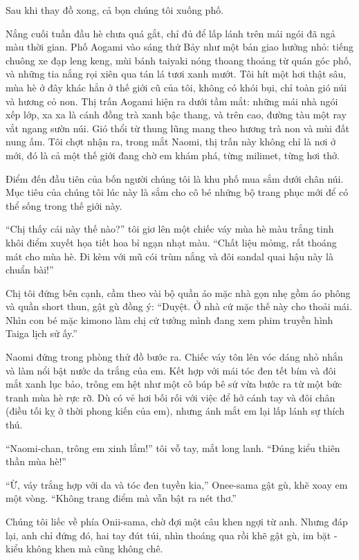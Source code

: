 \documentclass[../main.tex]{subfiles}
\begin{document}
Sau khi thay đồ xong, cả bọn chúng tôi xuống phố.

Nắng cuối tuần đầu hè chưa quá gắt, chỉ đủ để lấp lánh trên mái ngói đã ngả màu thời gian. Phố Aogami vào sáng thứ Bảy như một bản giao hưởng nhỏ: tiếng chuông xe đạp leng keng, mùi bánh taiyaki nóng thoang thoảng từ quán góc phố, và những tia nắng rọi xiên qua tán lá tươi xanh mướt. Tôi hít một hơi thật sâu, mùa hè ở đây khác hẳn ở thế giới cũ của tôi, không có khói bụi, chỉ toàn gió núi và hương cỏ non. Thị trấn Aogami hiện ra dưới tầm mắt: những mái nhà ngói xếp lớp, xa xa là cánh đồng trà xanh bậc thang, và trên cao, đường tàu một ray vắt ngang sườn núi. Gió thổi từ thung lũng mang theo hương trà non và mùi đất nung ấm. Tôi chợt nhận ra, trong mắt Naomi, thị trấn này không chỉ là nơi ở mới, đó là cả một thế giới đang chờ em khám phá, từng milimet, từng hơi thở.

Điểm đến đầu tiên của bốn người chúng tôi là khu phố mua sắm dưới chân núi. Mục tiêu của chúng tôi lúc này là sắm cho cô bé những bộ trang phục mới để có thể sống trong thế giới này.

``Chị thấy cái này thế nào?'' tôi giơ lên một chiếc váy mùa hè màu trắng tinh khôi điểm xuyết họa tiết hoa bỉ ngạn nhạt màu. ``Chất liệu mỏmg, rất thoáng mát cho mùa hè. Đi kèm với mũ cói trùm nắng và đôi sandal quai hậu này là chuẩn bài!''

Chị tôi đứng bên cạnh, cầm theo vài bộ quần áo mặc nhà gọn nhẹ gồm áo phông và quần short thun, gật gù đồng ý: ``Duyệt. Ở nhà cứ mặc thế này cho thoải mái. Nhìn con bé mặc kimono làm chị cứ tưởng mình đang xem phim truyền hình Taiga lịch sử ấy.''

Naomi đứng trong phòng thử đồ bước ra. Chiếc váy tôn lên vóc dáng nhỏ nhắn và làm nổi bật nước da trắng của em. Kết hợp với mái tóc đen tết bím và đôi mắt xanh lục bảo, trông em hệt như một cô búp bê sứ vừa bước ra từ một bức tranh mùa hè rực rỡ. Dù có vẻ hơi bối rối với việc để hở cánh tay và đôi chân (điều tối kỵ ở thời phong kiến của em), nhưng ánh mắt em lại lấp lánh sự thích thú.

``Naomi-chan, trông em xinh lắm!'' tôi vỗ tay, mắt long lanh. ``Đúng kiểu thiên thần mùa hè!''

``Ừ, váy trắng hợp với da và tóc đen tuyền kia,'' Onee-sama gật gù, khẽ xoay em một vòng. ``Không trang điểm mà vẫn bật ra nét thơ.''

Chúng tôi liếc về phía Onii-sama, chờ đợi một câu khen ngợi từ anh. Nhưng đáp lại, anh chỉ đứng đó, hai tay đút túi, nhìn thoáng qua rồi khẽ gật gù, im bặt - kiểu không khen mà cũng không chê.
\end{document}
